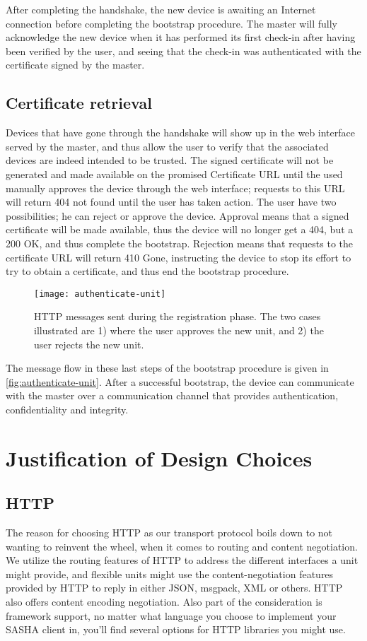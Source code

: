 After completing the handshake, the new device is awaiting an Internet connection before completing the bootstrap procedure. The master will fully acknowledge the new device when it has performed its first check-in after having been verified by the user, and seeing that the check-in was authenticated with the certificate signed by the master.

\subsection{Certificate retrieval}
Devices that have gone through the handshake will show up in the web interface served by the master, and thus allow the user to verify that the associated devices are indeed intended to be trusted. The signed certificate will not be generated and made available on the promised Certificate URL until the used manually approves the device through the web interface; requests to this URL will return 404 not found until the user has taken action.
The user have two possibilities; he can reject or approve the device. Approval means that a signed certificate will be made available, thus the device will no longer get a 404, but a 200 OK, and thus complete the bootstrap. Rejection means that requests to the certificate URL will return 410 Gone, instructing the device to stop its effort to try to obtain a certificate, and thus end the bootstrap procedure.

\begin{figure}[ht!]
    \centering
    \texttt{[image: authenticate-unit]}
    \caption{HTTP messages sent during the registration phase. The two cases illustrated are 1) where the user approves the new unit, and 2) the user rejects the new unit.}
    \label{fig:authenticate-unit}
\end{figure}

The message flow in these last steps of the bootstrap procedure is given in \autoref{fig:authenticate-unit}. After a successful bootstrap, the device can communicate with the master over a communication channel that provides authentication, confidentiality and integrity.


\section{Justification of Design Choices}

\subsection{HTTP}
The reason for choosing HTTP as our transport protocol boils down to not wanting to reinvent the wheel, when it comes to routing and content negotiation. We utilize the routing features of HTTP to address the different interfaces a unit might provide, and flexible units might use the content-negotiation features provided by HTTP to reply in either JSON, msgpack, XML or others. HTTP also offers content encoding negotiation. Also part of the consideration is framework support, no matter what language you choose to implement your SASHA client in, you'll find several options for HTTP libraries you might use.

